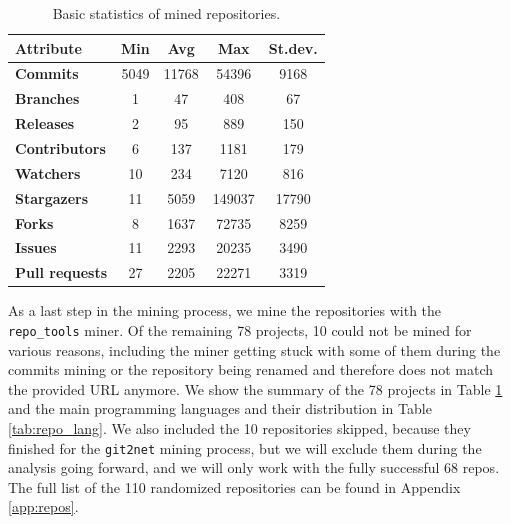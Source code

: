 \begin{table}
    \centering
        \begin{tabular}{| l | c | c | c | c |}
            \hline
            \textbf{Attribute} & \textbf{Min} & \textbf{Avg} & \textbf{Max} & \textbf{St.dev.} \\
            \hline
            \textbf{Commits} & 5049 & 11768 & 54396 & 9168 \\
            \textbf{Branches} & 1 & 47 & 408 & 67 \\
            \textbf{Releases} & 2 & 95 & 889 & 150 \\
            \textbf{Contributors} & 6 & 137 & 1181 & 179 \\
            \textbf{Watchers} & 10 & 234 & 7120 & 816 \\
            \textbf{Stargazers} & 11 & 5059 & 149037 & 17790 \\
            \textbf{Forks} & 8 & 1637 & 72735 & 8259 \\
            \textbf{Issues} & 11 & 2293 & 20235 & 3490 \\
            \textbf{Pull requests} & 27 & 2205 & 22271 & 3319\\
            \hline
        \end{tabular}
    \caption{Basic statistics of mined repositories.}
    \label{tab:repo_stats}
\end{table}

As a last step in the mining process, we mine the repositories with the \texttt{repo\_tools} miner. Of the remaining 78 projects, 10 could not be mined for various reasons, including the miner getting stuck with some of them during the commits mining or the repository being renamed and therefore does not match the provided URL anymore. We show the summary of the 78 projects in Table \ref{tab:repo_stats} and the main programming languages and their distribution in Table \ref{tab:repo_lang}. We also included the 10 repositories skipped, because they finished for the \texttt{git2net} mining process, but we will exclude them during the analysis going forward, and we will only work with the fully successful 68 repos. The full list of the 110 randomized repositories can be found in Appendix \ref{app:repos}.

